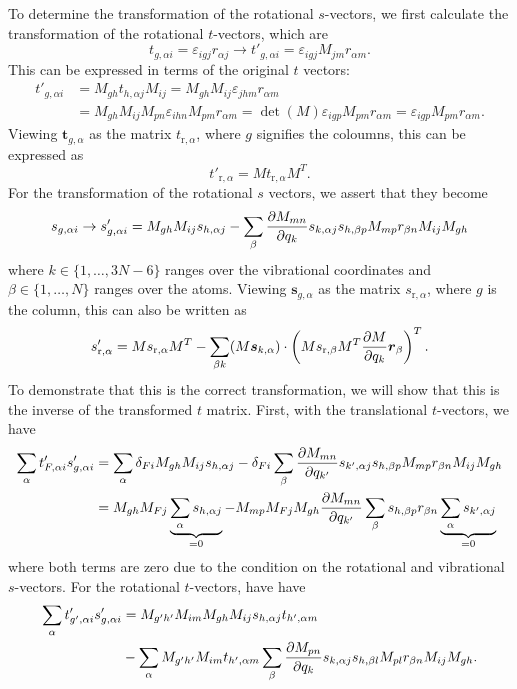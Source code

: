 \documentclass{article}
\newcommand{\vect}[1]{\boldsymbol{#1}}
\begin{document}
To determine the transformation of the rotational $s$-vectors, we first calculate the transformation of the rotational $t$-vectors, which are 
\[
t_{g, \alpha i} = \varepsilon_{igj}r_{\alpha j} \to t'_{g, \alpha i} = \varepsilon_{igj} M_{jm}r_{\alpha m}.
\]
This can be expressed in terms of the original $t$ vectors:
\[
\begin{split}
t'_{g,\alpha i} &= M_{gh} t_{h, \alpha j} M_{ij} = M_{gh} M_{ij} \varepsilon_{jhm} r_{\alpha m} \\&= M_{gh} M_{ij} M_{pn} \varepsilon_{ihn} M_{pm} r_{\alpha m} = \det(M) \varepsilon_{igp} M_{pm} r_{\alpha m} = \varepsilon_{igp} M_{pm} r_{\alpha m}.
\end{split}
\]
Viewing $\vect{t}_{g, \alpha}$ as the matrix $t_{\text{r},\alpha}$, where $g$ signifies the coloumns, this can be expressed as 
\[
t'_{\text{r}, \alpha} = Mt_{\text{r}, \alpha}M^{T}.
\]
For the transformation of the rotational $s$ vectors, we assert that they become
\[
s_{g, \alpha i} \to s'_{g, \alpha i} = M_{gh} M_{ij} s_{h, \alpha j} - 
\sum_{\beta} \pdv{M_{mn}}{q_{k}}s_{k, \alpha j} s_{h, \beta p} M_{mp} r_{\beta n} M_{ij} M_{gh} 
\]
where $k \in \{1, \ldots, 3N-6\}$ ranges over the vibrational coordinates and $\beta \in \{1, \ldots, N\}$ ranges over the atoms. Viewing $\vect{s}_{g, \alpha}$ as the matrix $s_{\text{r},\alpha}$, where $g$ is the column, this can also be written as 
\[
	s'_{\text{r}, \alpha} = Ms_{ \text{r}, \alpha}M^T - \sum_{\beta k} (M\vect{s}_{k, \alpha})\cdot\left(M s_{ \text{r}, \beta} M^T \pdv{M}{q_{k}}\vect{r}_\beta \right)^T.
\]
To demonstrate that this is the correct transformation, we will show that this is the inverse of the transformed $t$ matrix. First, with the translational $t$-vectors, we have
\[ \begin{split}
\sum_{\alpha} t'_{F, \alpha i} s'_{g, \alpha i} &= \sum_\alpha \delta_{Fi} M_{gh} M_{ij} s_{h, \alpha j} - \delta_{Fi} \sum_{\beta} \pdv{M_{mn}}{q_{k'}}s_{k', \alpha j} s_{h, \beta p} M_{mp} r_{\beta n} M_{ij} M_{gh} \\
&= M_{gh}M_{Fj} \underbrace{\sum_\alpha s_{h, \alpha j}}_{=0} - M_{mp}M_{Fj}M_{gh}\pdv{M_{mn}}{q_{k'}}\sum_\beta s_{h, \beta p} r_{\beta n} \underbrace{\sum_\alpha s_{k', \alpha j}}_{=0}
\end{split}
\]
where both terms are zero due to the condition on the rotational and vibrational $s$-vectors. For the rotational $t$-vectors, have have
\[
\begin{split}
 \sum_{\alpha} t'_{g', \alpha i} s'_{g, \alpha i} &= M_{g'h'} M_{im} M_{gh} M_{ij} s_{h, \alpha j}t_{h', \alpha m}  \\ &
-\sum_\alpha  M_{g'h'} M_{im} t_{h', \alpha m}\sum_{\beta} \pdv{M_{pn}}{q_{k}}s_{k, \alpha j} s_{h, \beta l} M_{pl} r_{\beta n} M_{ij} M_{gh}. \\
\end{split}
\]
\end{document}
